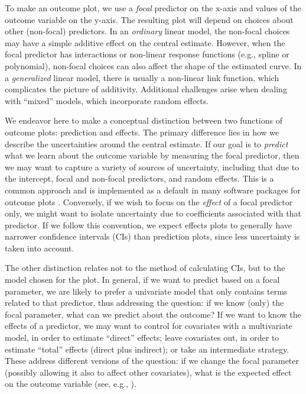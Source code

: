 To make an outcome plot, we use a \emph{focal} predictor on the x-axis and values of the outcome variable on the y-axis. The resulting plot will depend on choices about other (non-focal) predictors. In an \emph{ordinary} linear model, the non-focal choices may have a simple additive effect on the central estimate. However, when the focal predictor has interactions or non-linear response functions (e.g., spline or polynomial), non-focal choices can also affect the shape of the estimated curve. 
In a \emph{generalized} linear model, there is usually a non-linear link function, which complicates the picture of additivity.
Additional challenges arise when dealing with “mixed” models, which incorporate random effects.

We endeavor here to make a conceptual distinction between two functions of outcome plots: prediction and effects. 
The primary difference lies in how we describe the uncertainties around the central estimate. 
If our goal is to \emph{predict} what we learn about the outcome variable by measuring the focal predictor, then we may want to capture a variety of sources of uncertainty, including that due to the intercept, focal and non-focal predictors, and random effects. This is a common approach and is implemented as a default in many software packages for outcome plots \citep{fox2009effect, leeper2017package, lenth2018package,marginaleffects2023package}. 
Conversely, if we wish to focus on the \emph{effect} of a focal predictor only, we might want to isolate uncertainty due to coefficients associated with that predictor.
If we follow this convention, we expect effects plots to generally have narrower confidence intervals (CIs) than prediction plots, since less uncertainty is taken into account.

The other distinction relates not to the method of calculating CIs, but to the model chosen for the plot. 
In general, if we want to predict based on a focal parameter, we are likely to prefer a univariate model that only contains terms related to that predictor, thus addressing the question: if we know (only) the focal parameter, what can we predict about the outcome?
If we want to know the effects of a predictor, we may want to control for covariates with a multivariate model, in order to estimate “direct” effects; leave covariates out, in order to estimate “total” effects (direct plus indirect); or take an intermediate strategy.
These address different versions of the question: if we change the focal parameter (possibly allowing it also to affect other covariates), what is the expected effect on the outcome variable (see, e.g., \citep{shi_evidence_2017}).


